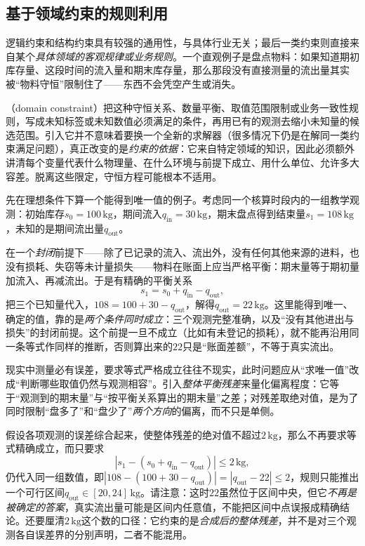 \subsection{基于领域约束的规则利用}
\label{sec:rule-based-knowledge-acquisition-domain-constraint}

逻辑约束和结构约束具有较强的通用性，与具体行业无关；最后一类约束则直接来自某个\emph{具体领域的客观规律或业务规则}。一个直观例子是盘点物料：如果知道期初库存量、这段时间的流入量和期末库存量，那么那段没有直接测量的流出量其实被“物料守恒”限制住了——东西不会凭空产生或消失。

（domain constraint）把这种守恒关系、数量平衡、取值范围限制或业务一致性规则，写成未知标签或未知数值必须满足的条件，再用已有的观测去缩小未知量的候选范围。引入它并不意味着要换一个全新的求解器（很多情况下仍是在解同一类约束满足问题），真正改变的是\emph{约束的依据}：它来自特定领域的知识，因此必须额外讲清每个变量代表什么物理量、在什么环境与前提下成立、用什么单位、允许多大容差。脱离这些限定，守恒方程可能根本不适用。

先在理想条件下算一个能得到唯一值的例子。考虑同一个核算时段内的一组教学观测：初始库存$s_0=100\,\mathrm{kg}$，期间流入$q_{\mathrm{in}}=30\,\mathrm{kg}$，期末盘点得到结束量$s_1=108\,\mathrm{kg}$，未知的是期间流出量$q_{\mathrm{out}}$。

在一个\emph{封闭}前提下——除了已记录的流入、流出外，没有任何其他来源的进料，也没有损耗、失窃等未计量损失——物料在账面上应当严格平衡：期末量等于期初量加流入、再减流出。于是有精确的平衡关系
\begin{equation}
  s_1=s_0+q_{\mathrm{in}}-q_{\mathrm{out}},
  \label{eq:rule-based-knowledge-acquisition-balance}
\end{equation}
把三个已知量代入，$108=100+30-q_{\mathrm{out}}$，解得$q_{\mathrm{out}}=22\,\mathrm{kg}$。这里能得到唯一、确定的值，靠的是\emph{两个条件同时成立}：三个观测完整准确，以及“没有其他进出与损失”的封闭前提。这个前提一旦不成立（比如有未登记的损耗），就不能再沿用同一条等式作同样的推断，否则算出来的$22$只是“账面差额”，不等于真实流出。

现实中测量必有误差，要求等式严格成立往往不现实，此时问题应从“求唯一值”改成“判断哪些取值仍然与观测相容”。引入\emph{整体平衡残差}来量化偏离程度：它等于“观测到的期末量”与“按平衡关系算出的期末量”之差；对残差取绝对值，是为了同时限制“盘多了”和“盘少了”\emph{两个方向}的偏离，而不只是单侧。

假设各项观测的误差综合起来，使整体残差的绝对值不超过$2\,\mathrm{kg}$，那么不再要求等式精确成立，而只要求
\[
  \left|s_1-(s_0+q_{\mathrm{in}}-q_{\mathrm{out}})\right|
  \leq 2\,\mathrm{kg},
\]
仍代入同一组数值，即$|108-(100+30-q_{\mathrm{out}})|=|q_{\mathrm{out}}-22|\leq2$，规则只能推出一个可行区间$q_{\mathrm{out}}\in[20,24]\,\mathrm{kg}$。请注意：这时$22$虽然位于区间中央，但它\emph{不再是被确定的答案}，真实流出量可能是区间内任意值，不能把区间中点误报成精确结论。还要厘清$2\,\mathrm{kg}$这个数的口径：它约束的是\emph{合成后的整体残差}，并不是对三个观测各自误差界的分别声明，二者不能混用。

